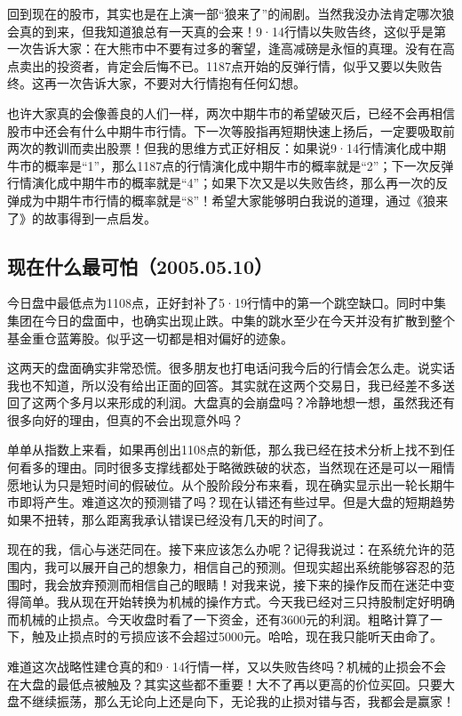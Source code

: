 回到现在的股市，其实也是在上演一部“狼来了”的闹剧。当然我没办法肯定哪次狼会真的到来，但我知道狼总有一天真的会来！9·14行情以失败告终，这似乎是第一次告诉大家：在大熊市中不要有过多的奢望，逢高减磅是永恒的真理。没有在高点卖出的投资者，肯定会后悔不已。1187点开始的反弹行情，似乎又要以失败告终。这再一次告诉大家，不要对大行情抱有任何幻想。

也许大家真的会像善良的人们一样，两次中期牛市的希望破灭后，已经不会再相信股市中还会有什么中期牛市行情。下一次等股指再短期快速上扬后，一定要吸取前两次的教训而卖出股票！但我的思维方式正好相反：如果说9·14行情演化成中期牛市的概率是“1”，那么1187点的行情演化成中期牛市的概率就是“2”；下一次反弹行情演化成中期牛市的概率就是“4”；如果下次又是以失败告终，那么再一次的反弹成为中期牛市行情的概率就是“8”！希望大家能够明白我说的道理，通过《狼来了》的故事得到一点启发。

\subsection{现在什么最可怕（2005.05.10）}

今日盘中最低点为1108点，正好封补了5·19行情中的第一个跳空缺口。同时中集集团在今日的盘面中，也确实出现止跌。中集的跳水至少在今天并没有扩散到整个基金重仓蓝筹股。似乎这一切都是相对偏好的迹象。

这两天的盘面确实非常恐慌。很多朋友也打电话问我今后的行情会怎么走。说实话我也不知道，所以没有给出正面的回答。其实就在这两个交易日，我已经差不多送回了这两个多月以来形成的利润。大盘真的会崩盘吗？冷静地想一想，虽然我还有很多向好的理由，但真的不会出现意外吗？

单单从指数上来看，如果再创出1108点的新低，那么我已经在技术分析上找不到任何看多的理由。同时很多支撑线都处于略微跌破的状态，当然现在还是可以一厢情愿地认为只是短时间的假破位。从个股阶段分布来看，现在确实显示出一轮长期牛市即将产生。难道这次的预测错了吗？现在认错还有些过早。但是大盘的短期趋势如果不扭转，那么距离我承认错误已经没有几天的时间了。

现在的我，信心与迷茫同在。接下来应该怎么办呢？记得我说过：在系统允许的范围内，我可以展开自己的想象力，相信自己的预测。但现实超出系统能够容忍的范围时，我会放弃预测而相信自己的眼睛！对我来说，接下来的操作反而在迷茫中变得简单。我从现在开始转换为机械的操作方式。今天我已经对三只持股制定好明确而机械的止损点。今天收盘时看了一下资金，还有3600元的利润。粗略计算了一下，触及止损点时的亏损应该不会超过5000元。哈哈，现在我只能听天由命了。

难道这次战略性建仓真的和9·14行情一样，又以失败告终吗？机械的止损会不会在大盘的最低点被触及？其实这些都不重要！大不了再以更高的价位买回。只要大盘不继续振荡，那么无论向上还是向下，无论我的止损对错与否，我都会是赢家！

